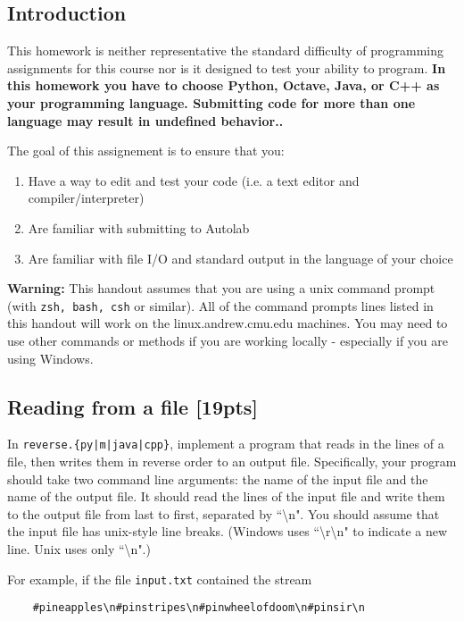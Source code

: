 \documentclass[12pt]{article}
\begin{document}
\subsection{Introduction}

This homework is neither representative the standard difficulty of programming assignments for this course nor is it designed to test your ability to program. \textbf{In this homework you have to choose Python, Octave, Java, or C++ as your programming language. Submitting code for more than one language may result in undefined behavior..}

The goal of this assignement is to ensure that you:
\begin{enumerate}
    \item Have a way to edit and test your code (i.e. a text editor and compiler/interpreter)
    \item Are familiar with submitting to Autolab
    \item Are familiar with file I/O and standard output in the language of your choice
\end{enumerate}

\textbf{Warning:} This handout assumes that you are using a unix command prompt (with \texttt{zsh, bash, csh} or similar). All of the command prompts lines listed in this handout will work on the linux.andrew.cmu.edu machines. You may need to use other commands or methods if you are working locally - especially if you are using Windows.

\subsection{Reading from a file [19pts]}

In \texttt{reverse.\{py|m|java|cpp\}}, implement a program that reads in the lines of a file, then writes them in reverse order to an output file. Specifically, your program should take two command line arguments: the name of the input file and the name of the output file. It should read the lines of the input file and write them to the output file from last to first, separated by ``\textbackslash n". You should assume that the input file has unix-style line breaks. (Windows uses ``\textbackslash r\textbackslash n" to indicate a new line. Unix uses only ``\textbackslash n".)

For example, if the file \texttt{input.txt} contained the stream

\begin{verbatim}
    #pineapples\n#pinstripes\n#pinwheelofdoom\n#pinsir\n
\end{verbatim}
\end{document}
